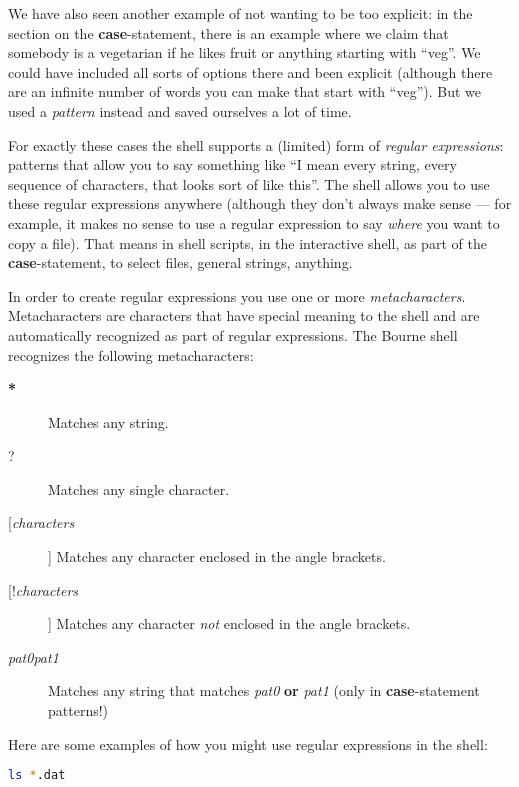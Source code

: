 We have also seen another example of not wanting to be too explicit: in the
section on the \textbf{case}-statement, there is an example where we claim that
somebody is a vegetarian if he likes fruit or anything starting with ``veg''.
We could have included all sorts of options there and been explicit (although
there are an infinite number of words you can make that start with ``veg'').
But we used a \emph{pattern} instead and saved ourselves a lot of time.

For exactly these cases the shell supports a (limited) form of \emph{regular
expressions}: patterns that allow you to say something like ``I mean every
string, every sequence of characters, that looks sort of like this''. The shell
allows you to use these regular expressions anywhere (although they don't
always make sense --- for example, it makes no sense to use a regular
expression to say \emph{where} you want to copy a file). That means in shell
scripts, in the interactive shell, as part of the \textbf{case}-statement, to
select files, general strings, anything.

In order to create regular expressions you use one or more
\emph{metacharacters}. Metacharacters are characters that have special meaning
to the shell and are automatically recognized as part of regular expressions.
The Bourne shell recognizes the following metacharacters:

\begin{description}
	\item[\textbf{*}] Matches any string.
	\item[?] Matches any single character.
	\item[[\emph{characters}]] Matches any character enclosed in the angle
brackets.
	\item[[!\emph{characters}]] Matches any character \emph{not} enclosed in
the angle brackets.
	\item[\emph{pat0}\textbar{}\emph{pat1}] Matches any string that matches
\emph{pat0} \textbf{or} \emph{pat1} (only in \textbf{case}-statement patterns!)
\end{description}

Here are some examples of how you might use regular expressions in the shell:

\lstset{basicstyle=\scriptsize, numbers=left, captionpos=b, tabsize=4}
\begin{lstlisting}[caption=List all files whose names end in .dat,language={bash},
breaklines=true,xleftmargin=15pt,label=lst:List all files whose names end in .dat]
ls *.dat
\end{lstlisting}

